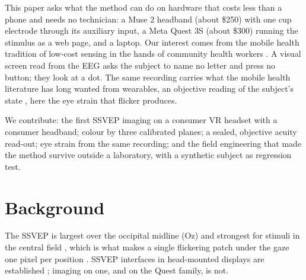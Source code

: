 \documentclass[conference]{IEEEtran}
\begin{document}
This paper asks what the method can do on hardware that costs less than a phone and needs no technician: a Muse 2 headband (about \$250) with one cup electrode through its auxiliary input, a Meta Quest 3S (about \$300) running the stimulus as a web page, and a laptop. Our interest comes from the mobile health tradition of low-cost sensing in the hands of community health workers \cite{fletcher2010wearable, fletcher2017child, anand2018pulmonary}. A visual screen read from the EEG asks the subject to name no letter and press no button; they look at a dot. The same recording carries what the mobile health literature has long wanted from wearables, an objective reading of the subject's state \cite{fletcher2010icalm, fletcher2014mental}, here the eye strain that flicker produces.

We contribute: the first SSVEP imaging on a consumer VR headset with a consumer headband; colour by three calibrated planes; a sealed, objective acuity read-out; eye strain from the same recording; and the field engineering that made the method survive outside a laboratory, with a synthetic subject as regression test.

\section{Background}

The SSVEP is largest over the occipital midline (Oz) and strongest for stimuli in the central field \cite{norcia2015ssvep}, which is what makes a single flickering patch under the gaze one pixel per position \cite{mann2019eye}. SSVEP interfaces in head-mounted displays are established \cite{armengol2018sublime}; imaging on one, and on the Quest family, is not.
\end{document}
